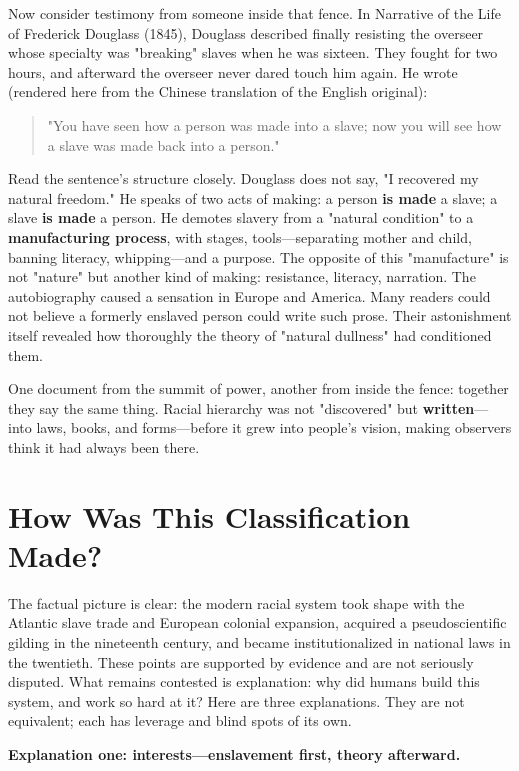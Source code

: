 Now consider testimony from someone inside that fence. In Narrative of the Life of Frederick Douglass (1845), Douglass described finally resisting the overseer whose specialty was "breaking" slaves when he was sixteen. They fought for two hours, and afterward the overseer never dared touch him again. He wrote (rendered here from the Chinese translation of the English original):

\begin{quote}
"You have seen how a person was made into a slave; now you will see how a slave was made back into a person."
\end{quote}
Read the sentence's structure closely. Douglass does not say, "I recovered my natural freedom." He speaks of two acts of making: a person \textbf{is made} a slave; a slave \textbf{is made} a person. He demotes slavery from a "natural condition" to a \textbf{manufacturing process}, with stages, tools---separating mother and child, banning literacy, whipping---and a purpose. The opposite of this "manufacture" is not "nature" but another kind of making: resistance, literacy, narration. The autobiography caused a sensation in Europe and America. Many readers could not believe a formerly enslaved person could write such prose. Their astonishment itself revealed how thoroughly the theory of "natural dullness" had conditioned them.

One document from the summit of power, another from inside the fence: together they say the same thing. Racial hierarchy was not "discovered" but \textbf{written}---into laws, books, and forms---before it grew into people's vision, making observers think it had always been there.

\section{How Was This Classification Made?}
The factual picture is clear: the modern racial system took shape with the Atlantic slave trade and European colonial expansion, acquired a pseudoscientific gilding in the nineteenth century, and became institutionalized in national laws in the twentieth. These points are supported by evidence and are not seriously disputed. What remains contested is explanation: why did humans build this system, and work so hard at it? Here are three explanations. They are not equivalent; each has leverage and blind spots of its own.

\textbf{Explanation one: interests---enslavement first, theory afterward.}

